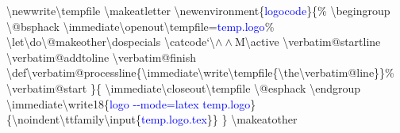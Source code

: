 \resetlinenumber
\begin{linenumbers}\singlespacing\ttfamily
\textbackslash newwrite\textbackslash tempf{}ile\newline
\textbackslash makeatletter\newline
\textbackslash newenvironment\{\textcolor{blue}{logocode}\}\{\%\newline
\hspace*{1.2em}\textbackslash begingroup\newline
\hspace*{1.2em}\textbackslash @bsphack\newline
\hspace*{1.2em}\textbackslash immediate\textbackslash openout\textbackslash tempf{}ile=\textcolor{blue}{temp.logo}\%\newline
\hspace*{1.2em}\textbackslash let\textbackslash do\textbackslash @makeother\textbackslash dospecials\newline
\hspace*{1.2em}\textbackslash catcode`\textbackslash$\wedge\wedge$M\textbackslash active\newline
\hspace*{1.2em}\textbackslash verbatim@startline\newline
\hspace*{1.2em}\textbackslash verbatim@addtoline\newline
\hspace*{1.2em}\textbackslash verbatim@f{}inish\newline
\hspace*{1.2em}\textbackslash def\textbackslash verbatim@processline\{\textbackslash immediate\textbackslash write\textbackslash tempf{}ile\{\textbackslash the\textbackslash verbatim@line\}\}\%\newline
\hspace*{1.2em}\textbackslash verbatim@start\newline
\}\{\newline
\hspace*{1.2em}\textbackslash immediate\textbackslash closeout\textbackslash tempf{}ile\newline
\hspace*{1.2em}\textbackslash @esphack\newline
\hspace*{1.2em}\textbackslash endgroup\newline
\hspace*{1.2em}\textbackslash immediate\textbackslash write18\{\textcolor{blue}{logo -{}-mode=latex temp.logo}\}\newline
\hspace*{1.2em}\{\textbackslash noindent\textbackslash ttfamily\textbackslash input\{\textcolor{blue}{temp.logo.tex}\}\}\newline
\}\newline
\textbackslash makeatother
\end{linenumbers}

